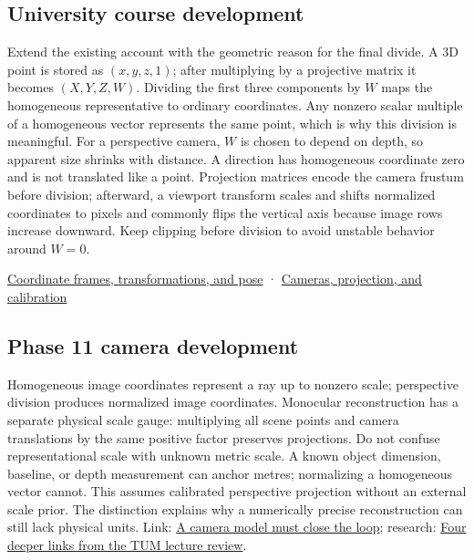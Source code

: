 \subsection{University course development}\label{university-course-development}

Extend the existing account with the geometric reason for the final divide. A 3D point is stored as \((x,y,z,1)\); after multiplying by a projective matrix it becomes \((X,Y,Z,W)\). Dividing the first three components by \(W\) maps the homogeneous representative to ordinary coordinates. Any nonzero scalar multiple of a homogeneous vector represents the same point, which is why this division is meaningful. For a perspective camera, \(W\) is chosen to depend on depth, so apparent size shrinks with distance. A direction has homogeneous coordinate zero and is not translated like a point. Projection matrices encode the camera frustum before division; afterward, a viewport transform scales and shifts normalized coordinates to pixels and commonly flips the vertical axis because image rows increase downward. Keep clipping before division to avoid unstable behavior around \(W=0\).

\href{Continuous\%20Notes/University\%20-\%20Worlds,\%20Images\%20and\%20Inference\%20-\%20Graphics,\%20Vision\%20and\%20Photography\#Coordinate\%20frames,\%20transformations,\%20and\%20pose}{Coordinate frames, transformations, and pose} · \href{Continuous\%20Notes/University\%20-\%20Worlds,\%20Images\%20and\%20Inference\%20-\%20Graphics,\%20Vision\%20and\%20Photography\#Cameras,\%20projection,\%20and\%20calibration}{Cameras, projection, and calibration}

\subsection{Phase 11 camera development}\label{phase-11-camera-development}

Homogeneous image coordinates represent a ray up to nonzero scale; perspective division produces normalized image coordinates. Monocular reconstruction has a separate physical scale gauge: multiplying all scene points and camera translations by the same positive factor preserves projections. Do not confuse representational scale with unknown metric scale. A known object dimension, baseline, or depth measurement can anchor metres; normalizing a homogeneous vector cannot. This assumes calibrated perspective projection without an external scale prior. The distinction explains why a numerically precise reconstruction can still lack physical units. Link: \href{Continuous\%20Notes/Computing\%20Foundations\%20-\%20From\%20Bits\%20to\%20C++\%20and\%20Systems\%20APIs\#A\%20camera\%20model\%20must\%20close\%20the\%20loop}{A camera model must close the loop}; research: \href{Continuous\%20Notes/Computing\%20Foundations\%20-\%20From\%20Bits\%20to\%20C++\%20and\%20Systems\%20APIs\#Four\%20deeper\%20links\%20from\%20the\%20TUM\%20lecture\%20review}{Four deeper links from the TUM lecture review}.
